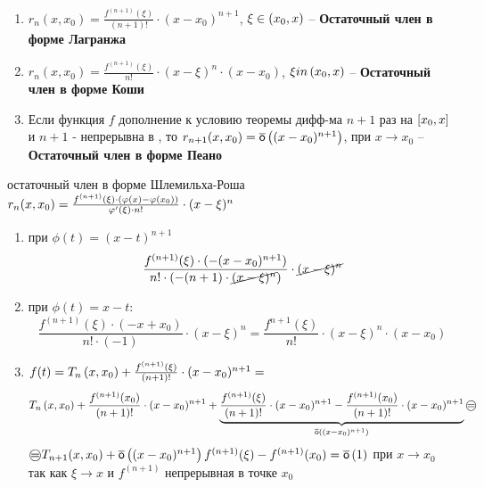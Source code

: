 \begin{sledsv}
	\begin{enumerate}
		\item $r_n(x,x_0) = \frac{f^{(n+1)}(\xi)}{(n+1)!}\cdot (x-x_0)^{n+1}$, $\xi \in \left( x_0,x\right)$ -- \textbf{Остаточный член в форме Лагранжа}
		\item $r_n(x,x_0) = \frac{f^{(n+1)}(\xi)}{n!}\cdot (x-\xi)^{n}\cdot (x-x_0)$, $\xi in \left( x_0, x\right)$ -- \textbf{Остаточный член в форме Коши}
		\item Если функция $f$ дополнение к условию теоремы дифф-ма $n+1$ раз на $\left[ x_0,x\right]$ и $n+1$ - непрерывна в , то $r_{n+1}(x,x_0) = \overline{\mathsf{o}}\left( (x-x_0)^{n+1}\right)$, при $x \to x_0$  -- \textbf{Остаточный член в форме Пеано}
	\end{enumerate}

	\begin{dokvo}
		остаточный член в форме Шлемильха-Роша $r_n(x,x_0) = \frac{f^{(n+1)}(\xi)  \cdot (\varphi(x)-\varphi(x_0))}{\varphi^{\prime}(\xi) \cdot n!}\cdot (x-\xi)^{n}$
		\begin{enumerate}
			\item при $\phi(t) = (x-t)^{n+1}$
			$$\frac{f^{(n+1)}(\xi) \cdot (-(x-x_0)^{n+1})}{n! \cdot (-(n+1)\cdot \cancel{(x - \xi)^{n}})}\cdot \cancel{(x-\xi)^{n}}$$
			\item при $\phi(t) = x - t:$
			$$\frac{f^{(n+1)}(\xi)\cdot (-x + x_0)}{n! \cdot (-1)}\cdot (x - \xi)^n = \frac{f^{n+1}(\xi)}{n!}\cdot(x-\xi)^{n}\cdot (x - x_0)$$
			\item $f(t) = T_n\left( x,x_0\right) + \frac{f^{(n+1)}(\xi)}{(n+1)!}\cdot (x-x_0)^{n+1} =$
			$$T_n\skobk{x,x_0} + \frac{f^{(n+1)}(x_0)}{(n+1)!}\cdot (x-x_0)^{n+1} + \underbrace{\frac{f^{(n+1)}(\xi)}{(n+1)!}\cdot (x-x_0)^{n+1} - \frac{f^{(n+1)}(x_0)}{(n+1)!}\cdot (x-x_0)^{n+1}}_{\omaloe{(x-x_0)^{n+1}}} \oeq$$
			$\oeq T_{n+1}(x,x_0) + \omaloe{ (x-x_0)^{n+1}} f^{(n+1)}(\xi)-f^{(n+1)}(x_0)=\omaloe{1}$ при $x\to x_0$ так как $\xi \to x$ и $f^{(n+1)}$ непрерывная в точке $x_0$
		\end{enumerate}
	\end{dokvo}
\end{sledsv}

